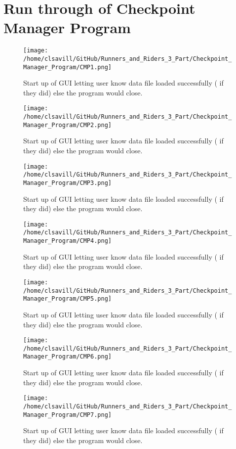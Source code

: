 \documentclass[a4paper,12pt]{article}
\begin{document}
\section{Run through of Checkpoint Manager Program}
\begin{figure}[H]
\texttt{[image: /home/clsavill/GitHub/Runners\_and\_Riders\_3\_Part/Checkpoint\_Manager\_Program/CMP1.png]}
\caption{Start up of GUI letting user know data file loaded successfully ( if they did) else the program would close.}
\end{figure}

\begin{figure}[H]
\texttt{[image: /home/clsavill/GitHub/Runners\_and\_Riders\_3\_Part/Checkpoint\_Manager\_Program/CMP2.png]}
\caption{Start up of GUI letting user know data file loaded successfully ( if they did) else the program would close.}
\end{figure}

\begin{figure}[H]
\texttt{[image: /home/clsavill/GitHub/Runners\_and\_Riders\_3\_Part/Checkpoint\_Manager\_Program/CMP3.png]}
\caption{Start up of GUI letting user know data file loaded successfully ( if they did) else the program would close.}
\end{figure}

\begin{figure}[H]
\texttt{[image: /home/clsavill/GitHub/Runners\_and\_Riders\_3\_Part/Checkpoint\_Manager\_Program/CMP4.png]}
\caption{Start up of GUI letting user know data file loaded successfully ( if they did) else the program would close.}
\end{figure}

\begin{figure}[H]
\texttt{[image: /home/clsavill/GitHub/Runners\_and\_Riders\_3\_Part/Checkpoint\_Manager\_Program/CMP5.png]}
\caption{Start up of GUI letting user know data file loaded successfully ( if they did) else the program would close.}
\end{figure}

\begin{figure}[H]
\texttt{[image: /home/clsavill/GitHub/Runners\_and\_Riders\_3\_Part/Checkpoint\_Manager\_Program/CMP6.png]}
\caption{Start up of GUI letting user know data file loaded successfully ( if they did) else the program would close.}
\end{figure}

\begin{figure}[H]
\texttt{[image: /home/clsavill/GitHub/Runners\_and\_Riders\_3\_Part/Checkpoint\_Manager\_Program/CMP7.png]}
\caption{Start up of GUI letting user know data file loaded successfully ( if they did) else the program would close.}
\end{figure}
\end{document}
